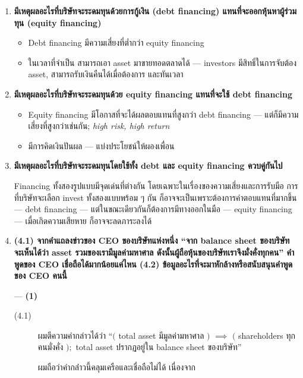 \documentclass[a4paper]{article}
\begin{document}
\begin{enumerate}[label*=\arabic*.]
    \item \textbf{มีเหตุผลอะไรที่บริษัทจะระดมทุนด้วยการกู้เงิน (debt financing) แทนที่จะออกหุ้นหาผู้ร่วมทุน (equity financing)}

    \begin{itemize}
        \item Debt financing มีความเสี่ยงที่ต่ำกว่า equity financing
        \item ในเวลาที่จำเป็น สามารถเอา asset มาขายทอดตลาดได้ --- investors มีสิทธิ์ในการจับต้อง asset, สามารถรับเงินคืนได้เมื่อต้องการ และทันเวลา
    \end{itemize}
    \item \textbf{มีเหตุผลอะไรที่บริษัทจะระดมทุนด้วย equity financing แทนที่จะใช้ debt financing}

    \begin{itemize}
        \item Equity financing มีโอกาสที่จะได้ผลตอบแทนที่สูงกว่า debt financing --- แต่ก็มีความเสี่ยงที่สูงกว่าเช่นกัน; \textit{high risk, high return}
        \item มีการคิดเงินปันผล --- แบ่งประโยชน์ให้ผองเพื่อน
    \end{itemize}
    \item \textbf{มีเหตุผลอะไรที่บริษัทจะระดมทุนโดยใช้ทั้ง debt และ equity financing ควบคู่กันไป}
    
    Financing ทั้งสองรูปแบบมีจุดเด่นที่ต่างกัน โดยเฉพาะในเรื่องของความเสี่ยงและการรับมือ การที่บริษัทจะเลือก invest ทั้งสองแบบพร้อม ๆ กัน ก็อาจจะเป็นเพราะต้องการค่าตอบแทนที่มากขึ้น --- debt financing ---
    แต่ในขณะเดียวกันก็ต้องการมีทางออกในมือ --- equity financing --- เมื่อเกิดความเสียหาย ก็อาจจะลดภาระลงได้
    \item \textbf{(4.1) จากคำแถลงข่าวของ CEO ของบริษัทแห่งหนึ่ง “จาก balance sheet ของบริษัท จะเห็นได้ว่า asset รวมของเรามีมูลค่ามหาศาล ดังนั้นผู้ถือหุ้นของบริษัทเราจึงมั่งคั่งทุกคน” คำพูดของ CEO เชื่อถือได้มากน้อยแค่ไหน (4.2) ข้อมูลอะไรที่จะมาหักล้างหรือสนับสนุนคำพูดของ CEO คนนี้}

     --- \textbf{(1)}

    \begin{description}
        \item[(4.1)] ผมตีความคำกล่าวได้ว่า ``$($ total asset มีมูลค่ามหาศาล $)$ $\implies$ $($ shareholders ทุกคนมั่งคั่ง $);$ total asset ปรากฏอยู่ใน balance sheet ของบริษัท''

        ผมถือว่าคำกล่่่าวนี้คลุมเครือและเชื่อถือไม่ได้ เนื่องจาก


\end{description}
\end{enumerate}
\end{document}
